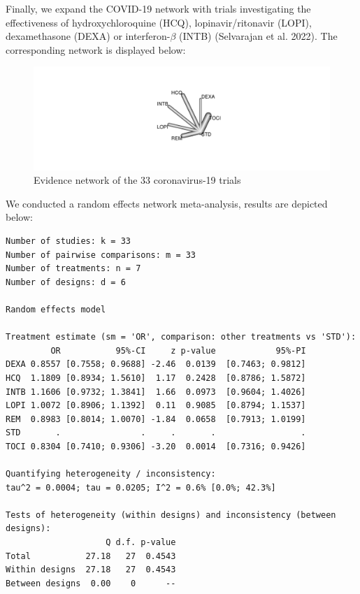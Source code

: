 \documentclass[
  letterpaper,
  DIV=11,
  numbers=noendperiod]{scrreprt}
\begin{document}
Finally, we expand the COVID-19 network with trials investigating the
effectiveness of hydroxychloroquine (HCQ), lopinavir/ritonavir (LOPI),
dexamethasone (DEXA) or interferon-\(\beta\) (INTB) (Selvarajan et al.
2022). The corresponding network is displayed below:

\begin{figure}

{\centering \includegraphics{chapter_10_files/figure-pdf/unnamed-chunk-20-1.pdf}

}

\caption{Evidence network of the 33 coronavirus-19 trials}

\end{figure}

We conducted a random effects network meta-analysis, results are
depicted below:

\begin{verbatim}
Number of studies: k = 33
Number of pairwise comparisons: m = 33
Number of treatments: n = 7
Number of designs: d = 6

Random effects model

Treatment estimate (sm = 'OR', comparison: other treatments vs 'STD'):
         OR           95%-CI     z p-value            95%-PI
DEXA 0.8557 [0.7558; 0.9688] -2.46  0.0139  [0.7463; 0.9812]
HCQ  1.1809 [0.8934; 1.5610]  1.17  0.2428  [0.8786; 1.5872]
INTB 1.1606 [0.9732; 1.3841]  1.66  0.0973  [0.9604; 1.4026]
LOPI 1.0072 [0.8906; 1.1392]  0.11  0.9085  [0.8794; 1.1537]
REM  0.8983 [0.8014; 1.0070] -1.84  0.0658  [0.7913; 1.0199]
STD       .                .     .       .                 .
TOCI 0.8304 [0.7410; 0.9306] -3.20  0.0014  [0.7316; 0.9426]

Quantifying heterogeneity / inconsistency:
tau^2 = 0.0004; tau = 0.0205; I^2 = 0.6% [0.0%; 42.3%]

Tests of heterogeneity (within designs) and inconsistency (between designs):
                    Q d.f. p-value
Total           27.18   27  0.4543
Within designs  27.18   27  0.4543
Between designs  0.00    0      --
\end{verbatim}
\end{document}
